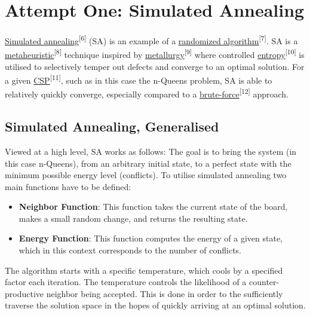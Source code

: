 \documentclass{article}
\begin{document}
\section{Attempt One: Simulated Annealing}
\href{https://en.wikipedia.org/wiki/Simulated_annealing}{Simulated annealing}\textsuperscript{[6]} (SA) is an example of a
\href{https://en.wikipedia.org/wiki/Randomized_algorithm}{randomized algorithm}\textsuperscript{[7]}.
SA is a \href{https://en.wikipedia.org/wiki/Metaheuristic}{metaheuristic}\textsuperscript{[8]} technique inspired by
\href{https://en.wikipedia.org/wiki/Metallurgy#:~:text=Metallurgy%20is%20a%20domain%20of,which%20are%20known%20as%20alloys.}{metallurgy}\textsuperscript{[9]} where controlled 
\href{https://en.wikipedia.org/wiki/Entropy}{entropy}\textsuperscript{[10]} is utilised to selectively temper out defects and converge to an optimal solution. For a given
\href{https://en.wikipedia.org/wiki/Constraint_satisfaction_problem}{CSP}\textsuperscript{[11]}, such as in this case the n-Queens problem, SA is able to relatively quickly converge,
especially compared to a \href{https://en.wikipedia.org/wiki/Brute-force_attack}{brute-force}\textsuperscript{[12]} approach.

\subsection{Simulated Annealing, Generalised}
Viewed at a high level, SA works as follows: The goal is to bring the system (in this case n-Queens), from an arbitrary initial state,
to a perfect state with the minimum possible energy level (conflicts).
To utilise simulated annealing two main functions have to be defined:

\begin{itemize}
    \item \textbf{Neighbor Function}: This function takes the current state of the board, makes a small random change, and returns the resulting state.
    \item \textbf{Energy Function}: This function computes the energy of a given state, which in this context corresponds to the number of conflicts.
\end{itemize}

The algorithm starts with a specific temperature, which cools by a specified factor each iteration.
The temperature controls the likelihood of a counter-productive neighbor being accepted.
This is done in order to the sufficiently traverse the solution space in the hopes of quickly arriving at an optimal solution.
\end{document}
